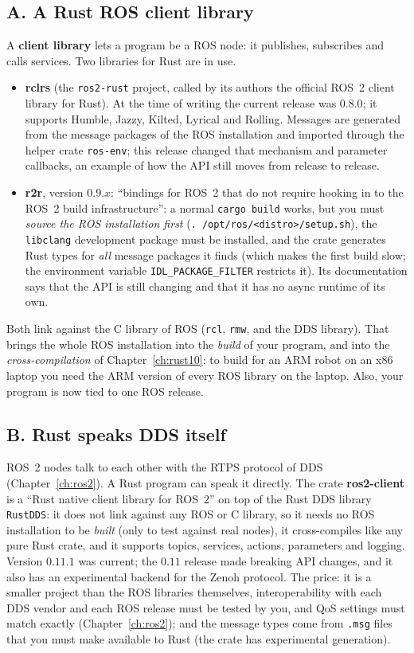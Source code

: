 \subsection*{A. A Rust ROS client library}
A \textbf{client library} lets a program be a ROS node: it publishes, subscribes and calls services. Two libraries for Rust are in use.
\begin{itemize}[nosep]
\item \textbf{rclrs} (the \verb!ros2-rust! project, called by its authors the official ROS~2 client library for Rust). At the time of writing the current release was $0.8.0$; it supports Humble, Jazzy, Kilted, Lyrical and Rolling. Messages are generated from the message packages of the ROS installation and imported through the helper crate \verb!ros-env!; this release changed that mechanism and parameter callbacks, an example of how the API still moves from release to release.
\item \textbf{r2r}, version $0.9.x$: ``bindings for ROS~2 that do not require hooking in to the ROS~2 build infrastructure'': a normal \verb!cargo build! works, but you must \emph{source the ROS installation first} (\verb!. /opt/ros/<distro>/setup.sh!), the \verb!libclang! development package must be installed, and the crate generates Rust types for \emph{all} message packages it finds (which makes the first build slow; the environment variable \verb!IDL_PACKAGE_FILTER! restricts it). Its documentation says that the API is still changing and that it has no async runtime of its own.
\end{itemize}
Both link against the C library of ROS (\verb!rcl!, \verb!rmw!, and the DDS library). That brings the whole ROS installation into the \emph{build} of your program, and into the \emph{cross-compilation} of Chapter~\ref{ch:rust10}: to build for an ARM robot on an x86 laptop you need the ARM version of every ROS library on the laptop. Also, your program is now tied to one ROS release.

\subsection*{B. Rust speaks DDS itself}
ROS~2 nodes talk to each other with the RTPS protocol of DDS (Chapter~\ref{ch:ros2}). A Rust program can speak it directly. The crate \textbf{ros2-client} is a ``Rust native client library for ROS~2'' on top of the Rust DDS library \verb!RustDDS!: it does not link against any ROS or C library, so it needs no ROS installation to be \emph{built} (only to test against real nodes), it cross-compiles like any pure Rust crate, and it supports topics, services, actions, parameters and logging. Version $0.11.1$ was current; the $0.11$ release made breaking API changes, and it also has an experimental backend for the Zenoh protocol. The price: it is a smaller project than the ROS libraries themselves, interoperability with each DDS vendor and each ROS release must be tested by you, and QoS settings must match exactly (Chapter~\ref{ch:ros2}); and the message types come from \verb!.msg! files that you must make available to Rust (the crate has experimental generation).

